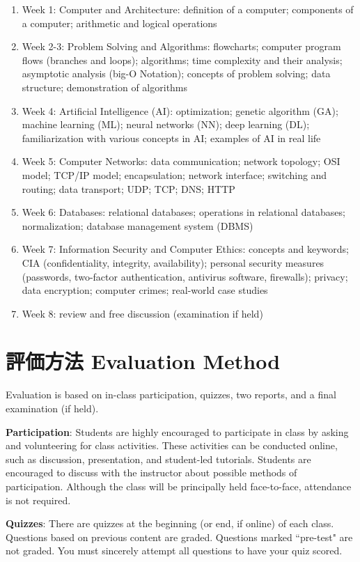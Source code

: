 \documentclass{article}
\begin{document}
\begin{enumerate}
    \item Week 1: Computer and Architecture: definition of a computer; components of a computer; arithmetic and logical operations
    \item Week 2-3: Problem Solving and Algorithms: flowcharts; computer program flows (branches and loops); algorithms; time complexity and their analysis; asymptotic analysis (big-O Notation); concepts of problem solving; data structure; demonstration of algorithms
    \item Week 4: Artificial Intelligence (AI): optimization; genetic algorithm (GA); machine learning (ML); neural networks (NN); deep learning (DL); familiarization with various concepts in AI; examples of AI in real life
    \item Week 5: Computer Networks: data communication; network topology; OSI model; TCP/IP model; encapsulation; network interface; switching and routing; data transport; UDP; TCP; DNS; HTTP
    \item Week 6: Databases: relational databases; operations in relational databases; normalization; database management system (DBMS)
    \item Week 7: Information Security and Computer Ethics: concepts and keywords; CIA (confidentiality, integrity, availability); personal security measures (passwords, two-factor authentication, antivirus software, firewalls); privacy; data encryption; computer crimes; real-world case studies
    \item Week 8: review and free discussion (examination if held)
\end{enumerate}

\section{評価方法 Evaluation Method}
Evaluation is based on in-class participation, quizzes, two reports, and a final examination (if held).

\smallskip\noindent
\textbf{Participation}: Students are highly encouraged to participate in class by asking and volunteering for class activities. These activities can be conducted online, such as discussion, presentation, and student-led tutorials. Students are encouraged to discuss with the instructor about possible methods of participation. Although the class will be principally held face-to-face, attendance is not required.

\smallskip\noindent
\textbf{Quizzes}: There are quizzes at the beginning (or end, if online) of each class. Questions based on previous content are graded. Questions marked ``pre-test" are not graded. You must sincerely attempt all questions to have your quiz scored.
\end{document}
